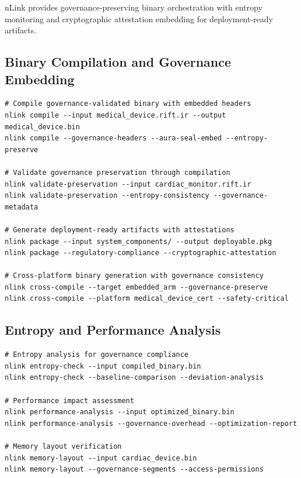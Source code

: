 \documentclass[11pt,letterpaper]{article}
\begin{document}
nLink provides governance-preserving binary orchestration with entropy monitoring and cryptographic attestation embedding for deployment-ready artifacts.

\subsection{Binary Compilation and Governance Embedding}

\begin{lstlisting}[language=shell, caption=nLink Binary Operations]
# Compile governance-validated binary with embedded headers
nlink compile --input medical_device.rift.ir --output medical_device.bin
nlink compile --governance-headers --aura-seal-embed --entropy-preserve

# Validate governance preservation through compilation
nlink validate-preservation --input cardiac_monitor.rift.ir
nlink validate-preservation --entropy-consistency --governance-metadata

# Generate deployment-ready artifacts with attestations
nlink package --input system_components/ --output deployable.pkg
nlink package --regulatory-compliance --cryptographic-attestation

# Cross-platform binary generation with governance consistency
nlink cross-compile --target embedded_arm --governance-preserve
nlink cross-compile --platform medical_device_cert --safety-critical
\end{lstlisting}

\subsection{Entropy and Performance Analysis}

\begin{lstlisting}[language=shell, caption=nLink Analysis Commands]
# Entropy analysis for governance compliance
nlink entropy-check --input compiled_binary.bin
nlink entropy-check --baseline-comparison --deviation-analysis

# Performance impact assessment
nlink performance-analysis --input optimized_binary.bin
nlink performance-analysis --governance-overhead --optimization-report

# Memory layout verification
nlink memory-layout --input cardiac_device.bin
nlink memory-layout --governance-segments --access-permissions
\end{lstlisting}

\end{document}
